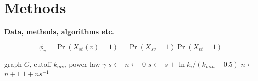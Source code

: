 \documentclass[9pt,twocolumn,twoside]{pnas-report}
\begin{document}
{\small

	\section*{Methods}

	 {\bf Data, methods, algorithms etc.}
	\lipsum[1]

	\begin{equation}
		\phi_v = \Pr(X_{st}(v) = 1) = \Pr(X_{sv} = 1)\Pr(X_{vt} = 1)
		\label{eq:example}
	\end{equation}

	\lipsum[2]

	\begin{algorithm}[H]
		\begin{algorithmic}[1]
			\Require graph $G$, cutoff $k_{min}$
			\Ensure power-law $\gamma$
			\State $s\gets$ $n\gets$ $0$
			\State $s\gets$ $s+\ln k_i/(k_{min}-0.5)$
			\State $n\gets$ $n+1$
			\EndIf
			\EndFor
			\State \Return $1+ns^{-1}$
		\end{algorithmic} \vspace{8pt}
	\end{algorithm}

	\lipsum[3-4]

}




\end{document}
